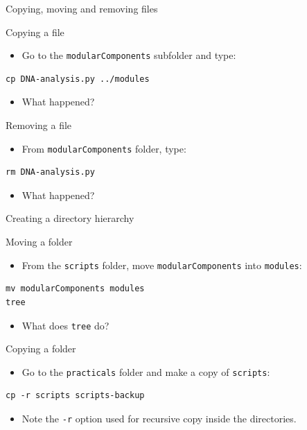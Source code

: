 \documentclass[big]{beamer}
\begin{document}
\begin{frame}[fragile,label=sec-2-24]{Copying, moving and removing files}
 \begin{block}{Copying a file}
\begin{itemize}
\item Go to the \texttt{modularComponents} subfolder and type:
\end{itemize}
\begin{verbatim}
cp DNA-analysis.py ../modules
\end{verbatim}
\begin{itemize}
\item What happened?
\end{itemize}
\end{block}
\begin{block}{Removing a file}
\begin{itemize}
\item From \texttt{modularComponents} folder, type:
\end{itemize}
\begin{verbatim}
rm DNA-analysis.py
\end{verbatim}
\begin{itemize}
\item What happened?
\end{itemize}
\end{block}
\end{frame}
\begin{frame}[fragile,label=sec-2-25]{Creating a directory hierarchy}
 \begin{block}{Moving a folder}
\begin{itemize}
\item From the \texttt{scripts} folder, move \texttt{modularComponents} into \texttt{modules}:
\end{itemize}
\begin{verbatim}
mv modularComponents modules
tree
\end{verbatim}
\begin{itemize}
\item What does \texttt{tree} do?
\end{itemize}
\end{block}
\begin{block}{Copying a folder}
\begin{itemize}
\item Go to the \texttt{practicals} folder and make a copy of \texttt{scripts}:
\end{itemize}
\begin{verbatim}
cp -r scripts scripts-backup
\end{verbatim}
\begin{itemize}
\item Note the \texttt{-r} option used for recursive copy inside the directories.
\end{itemize}
\end{block}
\end{frame}
\end{document}
